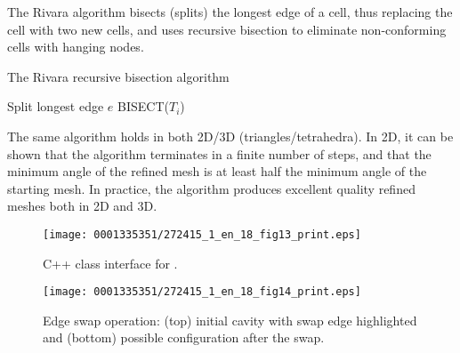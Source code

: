 The Rivara algorithm bisects (splits) the longest edge of a cell, thus
replacing the cell with two new cells, and uses recursive bisection to
eliminate non-conforming cells with hanging nodes.
\begin{algorithm}[!t]
\caption{The Rivara recursive bisection algorithm}
\label{alg:rivara}
\begin{algorithmic}
\State Split longest edge $e$
\State BISECT($T_i$)
\EndWhile
\EndProcedure
\end{algorithmic}
\end{algorithm}
The same algorithm holds in both 2D/3D (triangles/tetrahedra). In 2D,
it can be shown \citep{Rivara1992} that the algorithm terminates in a
finite number of steps, and that the minimum angle of the refined mesh
is at least half the minimum angle of the starting mesh. In practice,
the algorithm produces excellent quality refined meshes both in 2D and
3D.


\begin{figure}[!t]
\bwfig
\texttt{[image: 0001335351/272415\_1\_en\_18\_fig13\_print.eps]}
\caption{C++ class interface for {}.}
\label{code:ElasticSmoother}\vspace*{6pt}
\end{figure}


\begin{figure}[!t]
\centering
\texttt{[image: 0001335351/272415\_1\_en\_18\_fig14\_print.eps]}
\caption{Edge swap operation: (top) initial cavity with swap edge
highlighted and (bottom) possible configuration after the swap.}
\label{fig:op:eswap}\vspace*{6pt}
\end{figure}


